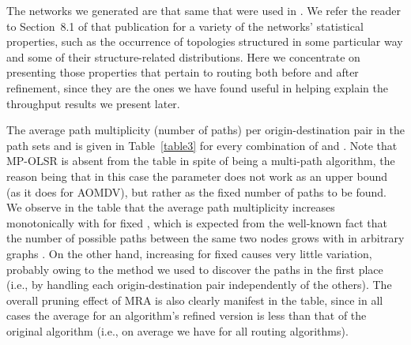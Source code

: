 \documentclass{article}
\begin{document}
The  networks we generated are that same that were used in
\cite{Fabio2012}. We refer the reader to Section~8.1 of that publication for a
variety of the networks' statistical properties, such as the occurrence of
topologies structured in some particular way and some of their
structure-related distributions. Here we concentrate on presenting those
properties that pertain to routing both before and after refinement, since they
are the ones we have found useful in helping explain the throughput results we
present later.

The average path multiplicity (number of paths) per origin-destination pair in
the path sets  and  is given in
Table~\ref{table3} for every combination of  and .
Note that MP-OLSR is absent from the table in spite of being a multi-path
algorithm, the reason being that in this case the  parameter does not work
as an upper bound (as it does for AOMDV), but rather as the fixed number of
paths to be found. We observe in the table that the average path multiplicity
increases monotonically with  for fixed , which is
expected from the well-known fact that the number of possible paths between the
same two nodes grows with  in arbitrary graphs \cite{Hoffman1963}. On
the other hand, increasing  for fixed  causes very little
variation, probably owing to the method we used to discover the paths in the
first place (i.e., by handling each origin-destination pair independently of the
others). The overall pruning effect of MRA is also clearly manifest in the
table, since in all cases the average for an algorithm's refined version is less
than that of the original algorithm (i.e., on average we have
 for all routing
algorithms).
\end{document}
